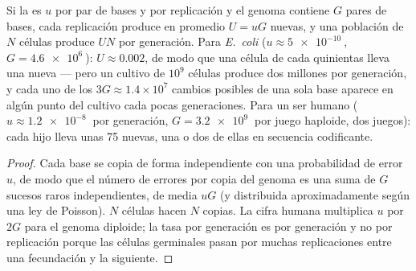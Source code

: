 \begin{theorem}\label{thm:b2:genome-diversification:rate}
Si la  es $u$ por par de bases y por replicación y el
genoma contiene $G$ pares de bases, cada replicación produce en promedio
$U = uG$  nuevas, y una población de $N$ células produce $UN$
por generación. Para \emph{E.~coli} ($u \approx \qty{5e-10}{}$, $G =
\qty{4.6e6}{}$): $U \approx 0.002$, de modo que una célula de cada
quinientas lleva una  nueva --- pero un cultivo de $10^{9}$
células produce dos millones por generación, y cada uno de los $3G \approx 1.4\times
10^{7}$ cambios posibles de una sola base aparece en algún punto del
cultivo cada pocas generaciones. Para un ser humano ($u \approx \qty{1.2e-8}{}$ por
generación, $G = \qty{3.2e9}{}$ por juego haploide, dos juegos): cada
hijo lleva unas \num{75}  nuevas, una o dos de ellas en
secuencia codificante.
\end{theorem}
\begin{proof}
Cada base se copia de forma independiente con una probabilidad de error
$u$, de modo que el número de errores por copia del genoma es una suma de
$G$ sucesos raros independientes, de media $uG$ (y distribuida
aproximadamente según una ley de Poisson). $N$ células hacen $N$ copias.
La cifra humana multiplica $u$ por $2G$ para el genoma diploide; la tasa
por generación es por generación y no por replicación porque las células
germinales pasan por muchas replicaciones entre una fecundación y la
siguiente.
\end{proof}

